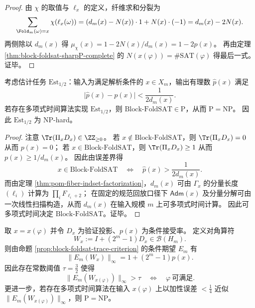 \begin{proof}
由 \(\chi\) 的取值与 \(\ell_x\) 的定义，纤维求和分裂为
\[
\sum_{\Fold_m(\omega)=x}\chi(\ell_x(\omega))
=(d_m(x)-N(x))\cdot 1+N(x)\cdot(-1)
=d_m(x)-2N(x).
\]
两侧除以 \(d_m(x)\) 得 \(\mu_{\chi}(x)=1-2N(x)/d_m(x)=1-2p(x)\)。
再由定理 \ref{thm:block-foldsat-sharpP-complete} 的 \(N(x(\varphi))=\#\mathrm{SAT}(\varphi)\) 得最后一式。证毕。
\end{proof}

\begin{proposition}\label{prop:block-foldsat-estimation-np-hard}
考虑估计任务 \(\mathrm{Est}_{1/2}\)：输入为满足解析条件的 \(x\in X_m\)，输出有理数 \(\widehat p(x)\) 满足
\[
\bigl|\widehat p(x)-p(x)\bigr|<\frac{1}{2d_m(x)}.
\]
若存在多项式时间算法实现 \(\mathrm{Est}_{1/2}\)，则 \(\mathrm{Block}\text{-}\mathrm{FoldSAT}\in\mathrm{P}\)，从而 \(\mathrm{P}=\mathrm{NP}\)。
因此 \(\mathrm{Est}_{1/2}\) 为 NP-hard。
\end{proposition}

\begin{proof}
注意 \(\Tr(\Pi_xD_x)\in\ZZ_{\ge 0}\)。
若 \(x\notin\mathrm{Block}\text{-}\mathrm{FoldSAT}\)，则 \(\Tr(\Pi_xD_x)=0\) 从而 \(p(x)=0\)；
若 \(x\in\mathrm{Block}\text{-}\mathrm{FoldSAT}\)，则 \(\Tr(\Pi_xD_x)\ge 1\) 从而 \(p(x)\ge 1/d_m(x)\)。
因此由误差界得
\[
x\in\mathrm{Block}\text{-}\mathrm{FoldSAT}
\quad\Longleftrightarrow\quad
\widehat p(x)>\frac{1}{2d_m(x)}.
\]
而由定理 \ref{thm:pom-fiber-indset-factorization}，\(d_m(x)\) 可由 \(\Gamma_x\) 的分量长度 \((\ell_i)\) 计算为 \(\prod_i F_{\ell_i+2}\)；
在固定的规范回放口径下 \(\mathsf{Adm}(x)\) 及分量分解可由一次线性扫描构造，从而 \(d_m(x)\) 在输入规模 \(m\) 上可多项式时间计算。
因此可多项式时间决定 \(\mathrm{Block}\text{-}\mathrm{FoldSAT}\)。证毕。
\end{proof}

\begin{theorem}[二值指数权重把指数精度困难提升为常数精度困难]\label{thm:block-foldsat-constant-precision-hardness}
取 \(x=x(\varphi)\) 并令 \(D_x\) 为验证投影、\(p(x)\) 为条件接受率。
定义对角算符
\[
W_x:=I+(2^m-1)D_x\in\mathcal B(H_m).
\]
则由命题 \ref{prop:block-foldsat-trace-criterion} 的条件期望 \(E_m\) 有
\[
\|E_m(W_x)\|_{\infty}=1+(2^m-1)p(x).
\]
因此存在常数阈值 \(\tau=\tfrac32\) 使得
\[
\|E_m(W_{x(\varphi)})\|_{\infty}>\tau
\quad\Longleftrightarrow\quad
\varphi\ \text{可满足}.
\]
更进一步，若存在多项式时间算法在输入 \(x(\varphi)\) 上以加性误差 \(<\tfrac14\) 近似 \(\|E_m(W_{x(\varphi)})\|_{\infty}\)，则 \(\mathrm{P}=\mathrm{NP}\)。
\end{theorem}

